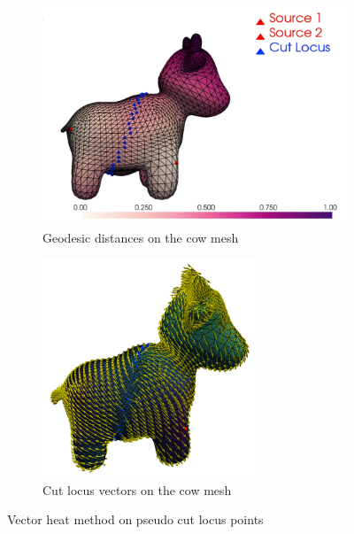 \documentclass[sigconf, nonacm]{acmart}
\begin{document}
\begin{figure}[htbp]
  \centering
  \hfill
  \begin{subfigure}[b]{0.23\textwidth}
    \centering
    \includegraphics[width=\textwidth]{img/cut_only_distances_pink.png}
    \caption{Geodesic distances on the cow mesh}
    \label{fig:cut_locus_only_distances}
  \end{subfigure}
  \begin{subfigure}[b]{0.23\textwidth}
    \centering
    \includegraphics[width=0.7\textwidth]{img/cow_cut_locus_vectors.png}
    \caption{Cut locus vectors on the cow mesh}
    \label{fig:cut_locus_cow_vectors}
  \end{subfigure}
  \caption{Vector heat method on pseudo cut locus points}
  \label{fig:cut_locus_vectors}
\end{figure}
\end{document}
